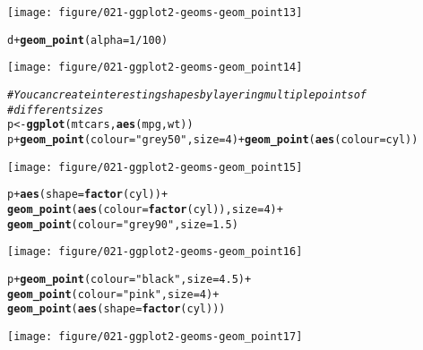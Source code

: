 \documentclass[a4paper,titlepage]{tufte-handout}\usepackage[]{graphicx}\usepackage[]{color}
\makeatletter
\def\maxwidth{ %
  \ifdim\Gin@nat@width>\linewidth
    \linewidth
  \else
    \Gin@nat@width
  \fi
}
\newcommand{\hlnum}[1]{\textcolor[rgb]{0.686,0.059,0.569}{#1}}%
\newcommand{\hlstr}[1]{\textcolor[rgb]{0.192,0.494,0.8}{#1}}%
\newcommand{\hlcom}[1]{\textcolor[rgb]{0.678,0.584,0.686}{\textit{#1}}}%
\newcommand{\hlopt}[1]{\textcolor[rgb]{0,0,0}{#1}}%
\newcommand{\hlstd}[1]{\textcolor[rgb]{0.345,0.345,0.345}{#1}}%
\newcommand{\hlkwb}[1]{\textcolor[rgb]{0.69,0.353,0.396}{#1}}%
\newcommand{\hlkwc}[1]{\textcolor[rgb]{0.333,0.667,0.333}{#1}}%
\newcommand{\hlkwd}[1]{\textcolor[rgb]{0.737,0.353,0.396}{\textbf{#1}}}%
\newenvironment{kframe}{%
 \def\at@end@of@kframe{}%
 \ifinner\ifhmode%
  \def\at@end@of@kframe{\end{minipage}}%
  \begin{minipage}{\columnwidth}%
 \fi\fi%
 \def\FrameCommand##1{\hskip\@totalleftmargin \hskip-\fboxsep
 \colorbox{shadecolor}{##1}\hskip-\fboxsep
     \hskip-\linewidth \hskip-\@totalleftmargin \hskip\columnwidth}%
 \MakeFramed {\advance\hsize-\width
   \@totalleftmargin\z@ \linewidth\hsize
   \@setminipage}}%
 {\par\unskip\endMakeFramed%
 \at@end@of@kframe}
\newenvironment{knitrout}{}{} %
\makeatother
\begin{document}
\begin{knitrout}
\begin{kframe}
\begin{alltt}
\end{alltt}
\end{kframe}
\texttt{[image: figure/021-ggplot2-geoms-geom\_point13]} 
\begin{kframe}\begin{alltt}
\hlstd{d} \hlopt{+} \hlkwd{geom_point}\hlstd{(}\hlkwc{alpha} \hlstd{=} \hlnum{1}\hlopt{/}\hlnum{100}\hlstd{)}
\end{alltt}
\end{kframe}
\texttt{[image: figure/021-ggplot2-geoms-geom\_point14]} 
\begin{kframe}\begin{alltt}
\hlcom{# You can create interesting shapes by layering multiple points of}
\hlcom{# different sizes}
\hlstd{p} \hlkwb{<-} \hlkwd{ggplot}\hlstd{(mtcars,} \hlkwd{aes}\hlstd{(mpg, wt))}
\hlstd{p} \hlopt{+} \hlkwd{geom_point}\hlstd{(}\hlkwc{colour}\hlstd{=}\hlstr{"grey50"}\hlstd{,} \hlkwc{size} \hlstd{=} \hlnum{4}\hlstd{)} \hlopt{+} \hlkwd{geom_point}\hlstd{(}\hlkwd{aes}\hlstd{(}\hlkwc{colour} \hlstd{= cyl))}
\end{alltt}
\end{kframe}
\texttt{[image: figure/021-ggplot2-geoms-geom\_point15]} 
\begin{kframe}\begin{alltt}
\hlstd{p} \hlopt{+} \hlkwd{aes}\hlstd{(}\hlkwc{shape} \hlstd{=} \hlkwd{factor}\hlstd{(cyl))} \hlopt{+}
  \hlkwd{geom_point}\hlstd{(}\hlkwd{aes}\hlstd{(}\hlkwc{colour} \hlstd{=} \hlkwd{factor}\hlstd{(cyl)),} \hlkwc{size} \hlstd{=} \hlnum{4}\hlstd{)} \hlopt{+}
  \hlkwd{geom_point}\hlstd{(}\hlkwc{colour}\hlstd{=}\hlstr{"grey90"}\hlstd{,} \hlkwc{size} \hlstd{=} \hlnum{1.5}\hlstd{)}
\end{alltt}
\end{kframe}
\texttt{[image: figure/021-ggplot2-geoms-geom\_point16]} 
\begin{kframe}\begin{alltt}
\hlstd{p} \hlopt{+} \hlkwd{geom_point}\hlstd{(}\hlkwc{colour}\hlstd{=}\hlstr{"black"}\hlstd{,} \hlkwc{size} \hlstd{=} \hlnum{4.5}\hlstd{)} \hlopt{+}
  \hlkwd{geom_point}\hlstd{(}\hlkwc{colour}\hlstd{=}\hlstr{"pink"}\hlstd{,} \hlkwc{size} \hlstd{=} \hlnum{4}\hlstd{)} \hlopt{+}
  \hlkwd{geom_point}\hlstd{(}\hlkwd{aes}\hlstd{(}\hlkwc{shape} \hlstd{=} \hlkwd{factor}\hlstd{(cyl)))}
\end{alltt}
\end{kframe}
\texttt{[image: figure/021-ggplot2-geoms-geom\_point17]} 

\end{knitrout}
\end{document}
